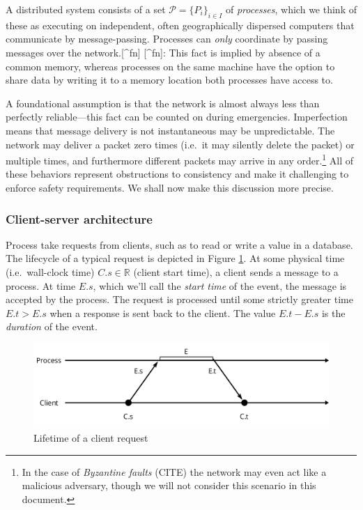 \documentclass[]             %
{NASA}                       %
\theoremstyle{definition}
\begin{document}
A distributed system consists of a set
\(\mathcal{P} = \{P_i\}_{i\in I}\) of \emph{processes}, which we think
of these as executing on independent, often geographically dispersed
computers that communicate by message-passing. Processes can \emph{only}
coordinate by passing messages over the network.{[}\^{}fn{]}
{[}\^{}fn{]}: This fact is implied by absence of a common memory,
whereas processes on the same machine have the option to share data by
writing it to a memory location both processes have access to.

A foundational assumption is that the network is almost always less than
perfectly reliable---this fact can be counted on during emergencies.
Imperfection means that message delivery is not instantaneous may be
unpredictable. The network may deliver a packet zero times (i.e.~it may
silently delete the packet) or multiple times, and furthermore different
packets may arrive in any order.\footnote{In the case of \emph{Byzantine
  faults} (CITE) the network may even act like a malicious adversary,
  though we will not consider this scenario in this document.} All of
these behaviors represent obstructions to consistency and make it
challenging to enforce safety requirements. We shall now make this
discussion more precise.

\hypertarget{client-server-architecture}{%
\subsubsection{Client-server
architecture}\label{client-server-architecture}}

Process take requests from clients, such as to read or write a value in
a database. The lifecycle of a typical request is depicted in Figure
\ref{fig:request}. At some physical time (i.e.~wall-clock time)
\(C.s \in \mathbb{R}\) (client start time), a client sends a message to
a process. At time \(E.s\), which we'll call the \emph{start time} of
the event, the message is accepted by the process. The request is
processed until some strictly greater time \(E.t > E.s\) when a response
is sent back to the client. The value \(E.t - E.s\) is the
\emph{duration} of the event.

\begin{figure}[h]
  \center
  \includegraphics[scale=0.4]{images/request.png}
  \caption{Lifetime of a client request}
  \label{fig:request}
\end{figure}
\end{document}
